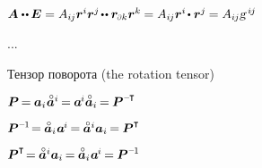 \begin{otherlanguage}{russian}
${
\bm{A} \dotdotp \hspace{-0.12ex} \UnitDyad
= A_{i\hspace{-0.1ex}j} \locationvector^i \locationvector^j \hspace{-0.25ex} \dotdotp \locationvector_\differentialindex{k} \locationvector^k \hspace{-0.1ex}
= A_{i\hspace{-0.1ex}j} \locationvector^i \hspace{-0.25ex} \dotp \locationvector^j \hspace{-0.1ex}
= A_{i\hspace{-0.1ex}j} \textsl{g}^{\hspace{.33ex}i\hspace{-0.1ex}j}
}$


...

Тензор поворота
(the rotation tensor)

$\bm{P} \hspace{-0.2ex} = \hspace{-0.1ex} \bm{a}_i \hspace{.1ex} \mathcircabove{\bm{a}}^i \hspace{-0.2ex} = \hspace{-0.1ex} \bm{a}^{\hspace{-0.16ex}i} \mathcircabove{\bm{a}}_i \hspace{-0.2ex} = \hspace{-0.1ex} \bm{P}^{\expminusT}$

$\bm{P}^{\expminusone} \hspace{-0.4ex} = \hspace{-0.1ex} \mathcircabove{\bm{a}}_i \hspace{.1ex} \bm{a}^{\hspace{-0.16ex}i} \hspace{-0.2ex} = \hspace{-0.1ex} \mathcircabove{\bm{a}}^i \bm{a}_i \hspace{-0.2ex} = \hspace{-0.1ex} \bm{P}^{\T}$

$\bm{P}^{\T} \hspace{-0.4ex} = \hspace{-0.1ex} \mathcircabove{\bm{a}}^i \bm{a}_i \hspace{-0.2ex} = \hspace{-0.1ex} \mathcircabove{\bm{a}}_i \hspace{.1ex} \bm{a}^{\hspace{-0.16ex}i} \hspace{-0.2ex} = \hspace{-0.1ex} \bm{P}^{\expminusone}$


\end{otherlanguage}
